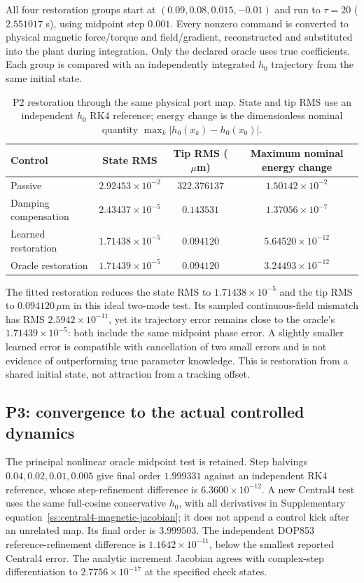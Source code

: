 All four restoration groups start at
$(0.09,0.08,0.015,-0.01)$ and run to $\tau=20$ ($2.551017$ s),
using midpoint step $0.001$. Every nonzero command is converted to
physical magnetic force/torque and field/gradient, reconstructed and
substituted into the plant during integration. Only the declared oracle
uses true coefficients. Each group is compared with an independently
integrated $h_0$ trajectory from the same initial state.

\begin{table}[t]
\centering
\caption{P2 restoration through the same physical port map. State and tip RMS use an independent $h_0$ RK4 reference; energy change is the dimensionless nominal quantity $\max_k|h_0(x_k)-h_0(x_0)|$.}
\label{num:a-table}
\begin{tabular}{lccc}
\toprule
Control & State RMS & Tip RMS ($\mu$m) & Maximum nominal energy change\\
\midrule
Passive & $2.92453\times10^{-2}$ & $322.376137$ & $1.50142\times10^{-2}$ \\
Damping compensation & $2.43437\times10^{-5}$ & $0.143531$ & $1.37056\times10^{-7}$ \\
Learned restoration & $1.71438\times10^{-5}$ & $0.094120$ & $5.64520\times10^{-12}$ \\
Oracle restoration & $1.71439\times10^{-5}$ & $0.094120$ & $3.24493\times10^{-12}$ \\
\bottomrule
\end{tabular}
\end{table}

The fitted restoration reduces the state RMS to $1.71438\times10^{-5}$
and the tip RMS to $0.094120\,\mu$m in this ideal two-mode test.
Its sampled continuous-field mismatch has RMS $2.5942\times10^{-11}$, yet its
trajectory error remains close to the oracle's $1.71439\times10^{-5}$:
both include the same midpoint phase error. A slightly smaller learned
error is compatible with cancellation of two small errors and is not
evidence of outperforming true parameter knowledge. This is restoration
from a shared initial state, not attraction from a tracking offset.

\subsection{P3: convergence to the actual controlled dynamics}
\label{num:p3}
\label{num:integration}
The principal nonlinear oracle midpoint test is retained. Step halvings
$0.04,0.02,0.01,0.005$ give final order $1.999331$ against an
independent RK4 reference, whose step-refinement difference is
$6.3600\times10^{-12}$. A new Central4 test uses the same full-cosine conservative
$h_0$, with all derivatives in Supplementary equation~\eqref{ss:central4-magnetic-jacobian}; it does not append a control
kick after an unrelated map. Its final order is $3.999503$.
The independent DOP853 reference-refinement difference is
$1.1642\times10^{-11}$, below the smallest reported Central4 error.
The analytic increment Jacobian agrees with complex-step differentiation
to $2.7756\times10^{-17}$ at the specified check states.

